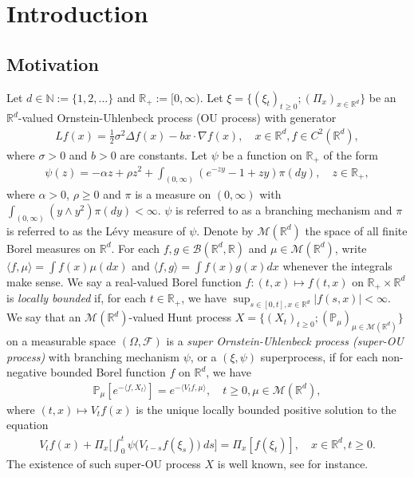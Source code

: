 \documentclass[12pt,a4paper]{amsart}
\theoremstyle{plain}
\theoremstyle{definition}
\numberwithin{equation}{section}
\begin{document}
\section{Introduction}
\subsection{Motivation}
\label{sec: Motivation}
Let $d \in \mathbb N:= \{1,2,\dots\}$ and $\mathbb R_+:= [0,\infty)$.
Let $\xi=\{(\xi_t)_{t\geq 0}; (\Pi_x)_{x\in \mathbb R^d}\}$ be an $\mathbb R^d$-valued Ornstein-Uhlenbeck process (OU process) with generator
\begin{align}
  Lf(x)
  = \frac{1}{2}\sigma^2\Delta f(x)-b x \cdot \nabla f(x)
  , \quad  x\in \mathbb R^d, f \in C^2(\mathbb R^d),
\end{align}
where $\sigma > 0$ and $b > 0$ are constants.
Let $\psi$ be a function on $\mathbb R_+$ of the form 
\begin{align} 
  \label{eq: honogeneou branching mechanism}
  \psi(z)=
  - \alpha z + \rho z^2 + \int_{(0,\infty)} (e^{-zy} - 1 + zy) \pi(dy)
  , \quad  z \in \mathbb R_+,
\end{align}
where $\alpha > 0 $, $\rho \geq0$ and $\pi$ is a measure on $(0,\infty)$ with $\int_{(0,\infty)}(y\wedge y^2) \pi(dy)< \infty$.
$\psi$ is referred to as a branching mechanism and $\pi$ is referred to as the L\'evy measure of $\psi$.
Denote by $\mathcal M(\mathbb R^d)$ the space of all finite Borel measures on $\mathbb R^d$.
For each $f,g\in \mathcal B(\mathbb R^d, \mathbb R)$ and $\mu \in \mathcal M(\mathbb R^d)$, write $\langle f,\mu\rangle = \int f(x)\mu(dx)$ and $\langle f, g\rangle = \int f(x)g(x) dx$ whenever the integrals make sense.
We say a real-valued Borel function $f:(t,x)\mapsto f(t,x)$ on $\mathbb R_+\times \mathbb R^d$ is \emph{locally bounded} if, for each $t\in \mathbb R_+$, we have $ \sup_{s\in [0,t],x\in \mathbb R^d} |f(s,x)|<\infty. $
We say that an $\mathcal M(\mathbb R^d)$-valued Hunt process $X = \{(X_t)_{t\geq 0}; (\mathbb{P}_{\mu})_{\mu \in \mathcal M(\mathbb R^d)}\}$ on a measurable space $(\Omega, \mathcal{F})$ is a \emph{super Ornstein-Uhlenbeck process (super-OU process)} with branching mechanism $\psi$, or a $(\xi, \psi)$ superprocess, if for each non-negative bounded Borel function $f$ on $\mathbb R^d$, we have
\begin{align}
  \label{eq: def of V_t}
  \mathbb{P}_{\mu}[e^{-\langle f,X_t \rangle}]
  = e^{-\langle V_tf, \mu \rangle}
  , \quad t\geq 0, \mu \in \mathcal M(\mathbb R^d),
\end{align}
where $(t,x) \mapsto V_tf(x)$ is the unique locally bounded positive solution to the equation
\begin{align}
  V_tf(x) + \Pi_x \Big[ \int_0^t\psi\big(V_{t-s}f(\xi_s)\big)~ds\Big]
	= \Pi_x [f(\xi_t)]
  , \quad x\in \mathbb R^d, t\geq 0.
\end{align}	
The existence of such super-OU process $X$ is well known, see \cite{Dynkin1993Superprocesses} for instance.
\end{document}
